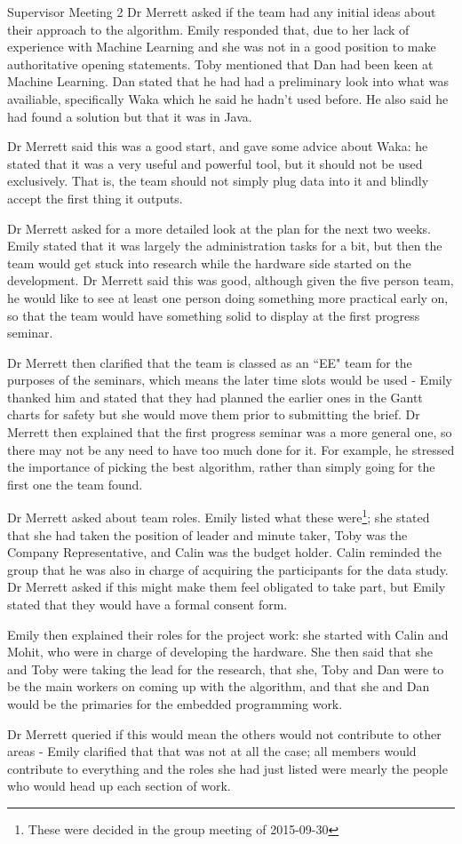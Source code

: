 \documentclass{article}
\begin{document}
\begin{Minutes}{Supervisor Meeting 2}
Dr Merrett asked if the team had any initial ideas about their approach to the algorithm. Emily
responded that, due to her lack of experience with Machine Learning and she was not in a good
position to make authoritative opening statements. Toby mentioned that Dan had been keen at
Machine Learning. Dan stated that he had had a preliminary look into what was availiable,
specifically Waka which he said he hadn't used before. He also said he had found a solution
but that it was in Java.

Dr Merrett said this was a good start, and gave some advice about Waka: he stated that it was
a very useful and powerful tool, but it should not be used exclusively. That is, the team should
not simply plug data into it and blindly accept the first thing it outputs.

Dr Merrett asked for a more detailed look at the plan for the next two weeks. Emily stated that
it was largely the administration tasks for a bit, but then the team would get stuck into
research while the hardware side started on the development. Dr Merrett said this was good,
although given the five person team, he would like to see at least one person doing something
more practical early on, so that the team would have something solid to display at the first
progress seminar.

Dr Merrett then clarified that the team is classed as an ``EE" team for the purposes of the
seminars, which means the later time slots would be used - Emily thanked him and stated that
they had planned the earlier ones in the Gantt charts for safety but she would move them
prior to submitting the brief. Dr Merrett then explained that the first progress seminar was
a more general one, so there may not be any need to have too much done for it. For example,
he stressed the importance of picking the best algorithm, rather than simply going for the
first one the team found.

Dr Merrett asked about team roles. Emily listed what these were\footnote
{These were decided in the group meeting of 2015-09-30}; she stated that she had taken the
position of leader and minute taker, Toby was the Company Representative, and Calin was the
budget holder. Calin reminded the group that he was also in charge of acquiring the participants
for the data study. Dr Merrett asked if this might make them feel obligated to take part, but
Emily stated that they would have a formal consent form.

Emily then explained their roles for the project work: she started with Calin and Mohit, who
were in charge of developing the hardware. She then said that she and Toby were taking the
lead for the research, that she, Toby and Dan were to be the main workers on coming up with
the algorithm, and that she and Dan would be the primaries for the embedded programming work.

Dr Merrett queried if this would mean the others would not contribute to other areas - Emily
clarified that that was not at all the case; all members would contribute to everything and
the roles she had just listed were mearly the people who would head up each section of work.

\end{Minutes}
\end{document}
